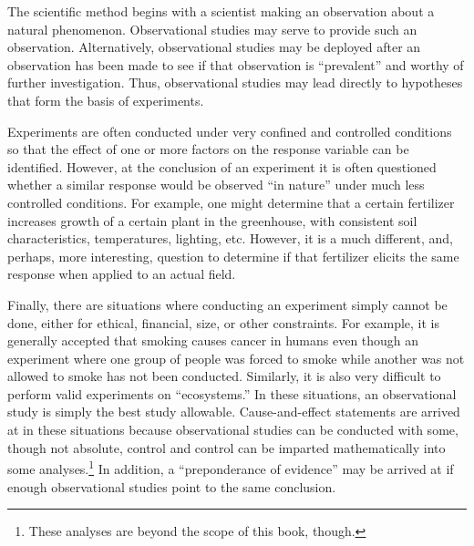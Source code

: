 \documentclass[10pt,openany]{book}\usepackage[]{graphicx}\usepackage[]{color}
\begin{document}
The scientific method begins with a scientist making an observation about a natural phenomenon.  Observational studies may serve to provide such an observation.  Alternatively, observational studies may be deployed after an observation has been made to see if that observation is ``prevalent'' and worthy of further investigation.  Thus, observational studies may lead directly to hypotheses that form the basis of experiments.

Experiments are often conducted under very confined and controlled conditions so that the effect of one or more factors on the response variable can be identified.  However, at the conclusion of an experiment it is often questioned whether a similar response would be observed ``in nature'' under much less controlled conditions.  For example, one might determine that a certain fertilizer increases growth of a certain plant in the greenhouse, with consistent soil characteristics, temperatures, lighting, etc.  However, it is a much different, and, perhaps, more interesting, question to determine if that fertilizer elicits the same response when applied to an actual field.

Finally, there are situations where conducting an experiment simply cannot be done, either for ethical, financial, size, or other constraints.  For example, it is generally accepted that smoking causes cancer in humans even though an experiment where one group of people was forced to smoke while another was not allowed to smoke has not been conducted.  Similarly, it is also very difficult to perform valid experiments on ``ecosystems.''  In these situations, an observational study is simply the best study allowable.  Cause-and-effect statements are arrived at in these situations because observational studies can be conducted with some, though not absolute, control and control can be imparted mathematically into some analyses.\footnote{These analyses are beyond the scope of this book, though.}  In addition, a ``preponderance of evidence'' may be arrived at if enough observational studies point to the same conclusion.
\end{document}
